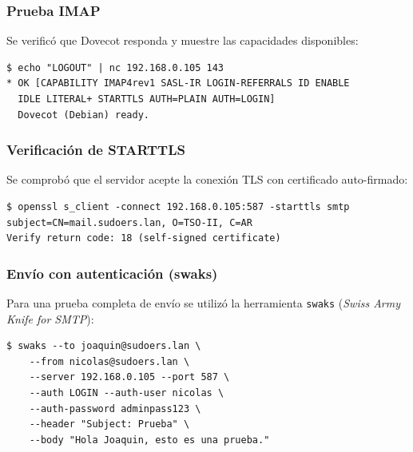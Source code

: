 \subsubsection{Prueba IMAP}

Se verificó que Dovecot responda y muestre las capacidades disponibles:

\begin{lstlisting}[style=terminal]
$ echo "LOGOUT" | nc 192.168.0.105 143
* OK [CAPABILITY IMAP4rev1 SASL-IR LOGIN-REFERRALS ID ENABLE
  IDLE LITERAL+ STARTTLS AUTH=PLAIN AUTH=LOGIN]
  Dovecot (Debian) ready.
\end{lstlisting}


\subsubsection{Verificación de STARTTLS}

Se comprobó que el servidor acepte la conexión TLS con certificado
auto-firmado:

\begin{lstlisting}[style=terminal]
$ openssl s_client -connect 192.168.0.105:587 -starttls smtp
subject=CN=mail.sudoers.lan, O=TSO-II, C=AR
Verify return code: 18 (self-signed certificate)
\end{lstlisting}


\subsubsection{Envío con autenticación (swaks)}

Para una prueba completa de envío se utilizó la herramienta \texttt{swaks}
(\textit{Swiss Army Knife for SMTP}):

\begin{lstlisting}[style=terminal]
$ swaks --to joaquin@sudoers.lan \
    --from nicolas@sudoers.lan \
    --server 192.168.0.105 --port 587 \
    --auth LOGIN --auth-user nicolas \
    --auth-password adminpass123 \
    --header "Subject: Prueba" \
    --body "Hola Joaquin, esto es una prueba."
\end{lstlisting}

